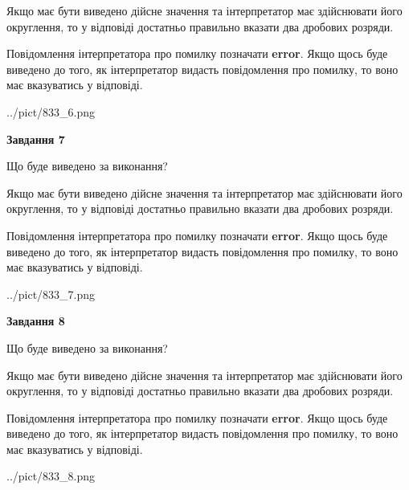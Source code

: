 \documentclass[12pt, ukrainian]{article}
\begin{document}
{\begin {Large}
Якщо має бути виведено дійсне значення та інтерпретатор має здійснювати його округлення, 
то у відповіді достатньо правильно вказати два дробових розряди.

Повідомлення інтерпретатора про помилку позначати \textbf{error}.
Якщо щось буде виведено до того, як інтерпретатор видасть повідомлення про помилку, 
то воно має вказуватись у відповіді. \par

\begin{center}
	{../pict/833_6.png}
\end{center}
\newpage

{\begin {center}\textbf{Завдання 7}\end {center}}\par
Що буде виведено за виконання? \par

Якщо має бути виведено дійсне значення та інтерпретатор має здійснювати його округлення, 
то у відповіді достатньо правильно вказати два дробових розряди.

Повідомлення інтерпретатора про помилку позначати \textbf{error}.
Якщо щось буде виведено до того, як інтерпретатор видасть повідомлення про помилку, 
то воно має вказуватись у відповіді. \par

\begin{center}
	{../pict/833_7.png}
\end{center}
\newpage

{\begin {center}\textbf{Завдання 8}\end {center}}\par
Що буде виведено за виконання? \par

Якщо має бути виведено дійсне значення та інтерпретатор має здійснювати його округлення, 
то у відповіді достатньо правильно вказати два дробових розряди.

Повідомлення інтерпретатора про помилку позначати \textbf{error}.
Якщо щось буде виведено до того, як інтерпретатор видасть повідомлення про помилку, 
то воно має вказуватись у відповіді. \par

\begin{center}
	{../pict/833_8.png}
\end{center}
\newpage


\end{Large}}
\end{document}
